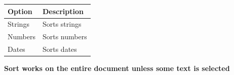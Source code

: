 \begin{scriptsize}
  \begin{tabularx}{\textwidth}{>{\hsize=0.3\hsize}X>{\hsize=0.7\hsize}X}\\
    \hline
    \textbf{Option} & \textbf{Description} \\
    \hline
    Strings & Sorts strings \\
    Numbers & Sorts numbers \\
    Dates & Sorts dates \\
    \hline
  \end{tabularx}
\end{scriptsize}

\textbf{Sort works on the entire document unless some text is selected}
